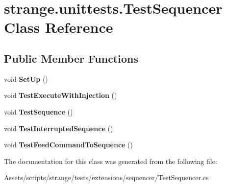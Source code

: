\hypertarget{classstrange_1_1unittests_1_1_test_sequencer}{\section{strange.\-unittests.\-Test\-Sequencer Class Reference}
\label{classstrange_1_1unittests_1_1_test_sequencer}
}
\subsection*{Public Member Functions}
\begin{DoxyCompactItemize}
\item 
\hypertarget{classstrange_1_1unittests_1_1_test_sequencer_a2da9db87abe504e6284eec4910c8f495}{void {\bfseries Set\-Up} ()}\label{classstrange_1_1unittests_1_1_test_sequencer_a2da9db87abe504e6284eec4910c8f495}

\item 
\hypertarget{classstrange_1_1unittests_1_1_test_sequencer_a77a556bcf8ae4c2841bfb52c0b21f406}{void {\bfseries Test\-Execute\-With\-Injection} ()}\label{classstrange_1_1unittests_1_1_test_sequencer_a77a556bcf8ae4c2841bfb52c0b21f406}

\item 
\hypertarget{classstrange_1_1unittests_1_1_test_sequencer_a03f8c88e0abba843a5b160cd1a802c85}{void {\bfseries Test\-Sequence} ()}\label{classstrange_1_1unittests_1_1_test_sequencer_a03f8c88e0abba843a5b160cd1a802c85}

\item 
\hypertarget{classstrange_1_1unittests_1_1_test_sequencer_aa117d21d04c6c0506fcdc4bbbb958f2e}{void {\bfseries Test\-Interrupted\-Sequence} ()}\label{classstrange_1_1unittests_1_1_test_sequencer_aa117d21d04c6c0506fcdc4bbbb958f2e}

\item 
\hypertarget{classstrange_1_1unittests_1_1_test_sequencer_a7014b76f597ef6fa6ac69d5a4ea1d63e}{void {\bfseries Test\-Feed\-Command\-To\-Sequence} ()}\label{classstrange_1_1unittests_1_1_test_sequencer_a7014b76f597ef6fa6ac69d5a4ea1d63e}

\end{DoxyCompactItemize}


The documentation for this class was generated from the following file\-:\begin{DoxyCompactItemize}
\item 
Assets/scripts/strange/tests/extensions/sequencer/Test\-Sequencer.\-cs\end{DoxyCompactItemize}
